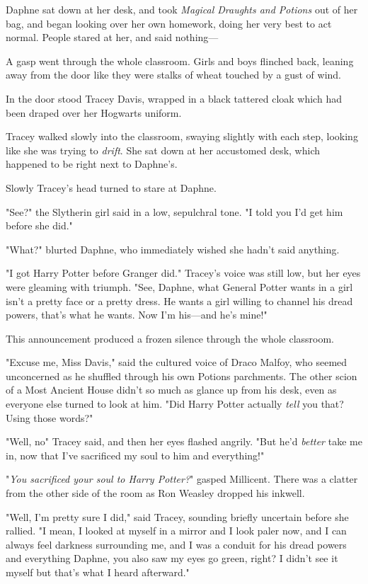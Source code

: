 Daphne sat down at her desk, and took \emph{Magical Draughts and Potions} out
of her bag, and began looking over her own homework, doing her very best to act
normal. People stared at her, and said nothing—

A gasp went through the whole classroom. Girls and boys flinched back, leaning
away from the door like they were stalks of wheat touched by a gust of wind.

In the door stood Tracey Davis, wrapped in a black tattered cloak which had
been draped over her Hogwarts uniform.

Tracey walked slowly into the classroom, swaying slightly with each step,
looking like she was trying to \emph{drift}. She sat down at her accustomed
desk, which happened to be right next to Daphne's.

Slowly Tracey's head turned to stare at Daphne.

"See?" the Slytherin girl said in a low, sepulchral tone. "I told you I'd get
him before she did."

"What?" blurted Daphne, who immediately wished she hadn't said anything.

"I got Harry Potter before Granger did." Tracey's voice was still low, but her
eyes were gleaming with triumph. "See, Daphne, what General Potter wants in a
girl isn't a pretty face or a pretty dress. He wants a girl willing to channel
his dread powers, that's what he wants. Now I'm his—and he's mine!"

This announcement produced a frozen silence through the whole classroom.

"Excuse me, Miss Davis," said the cultured voice of Draco Malfoy, who seemed
unconcerned as he shuffled through his own Potions parchments. The other scion
of a Most Ancient House didn't so much as glance up from his desk, even as
everyone else turned to look at him. "Did Harry Potter actually \emph{tell} you
that? Using those words?"

"Well, no{\el}" Tracey said, and then her eyes flashed angrily. "But he'd
\emph{better} take me in, now that I've sacrificed my soul to him and
everything!"

"\emph{You sacrificed your soul to Harry Potter?}" gasped Millicent. There was
a clatter from the other side of the room as Ron Weasley dropped his inkwell.

"Well, I'm pretty sure I did," said Tracey, sounding briefly uncertain before
she rallied. "I mean, I looked at myself in a mirror and I look paler now, and
I can always feel darkness surrounding me, and I was a conduit for his dread
powers and everything{\el} Daphne, you also saw my eyes go green, right? I
didn't see it myself but that's what I heard afterward."

